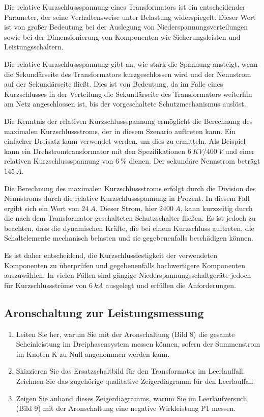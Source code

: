 \begin{enumerate}[label=\alph*)]
  Die relative Kurzschlussspannung eines Transformators ist ein entscheidender Parameter, der seine Verhaltensweise unter Belastung widerspiegelt. Dieser Wert ist von großer Bedeutung bei der Auslegung von Niederspannungsverteilungen sowie bei der Dimensionierung von Komponenten wie Sicherungsleisten und Leistungsschaltern.
  
  Die relative Kurzschlussspannung gibt an, wie stark die Spannung ansteigt, wenn die Sekundärseite des Transformators kurzgeschlossen wird und der Nennstrom auf der Sekundärseite fließt. Dies ist von Bedeutung, da im Falle eines Kurzschlusses in der Verteilung die Sekundärseite des Transformators weiterhin am Netz angeschlossen ist, bis der vorgeschaltete Schutzmechanismus auslöst.
  
  Die Kenntnis der relativen Kurzschlussspannung ermöglicht die Berechnung des maximalen Kurzschlussstroms, der in diesem Szenario auftreten kann. Ein einfacher Dreisatz kann verwendet werden, um dies zu ermitteln. Als Beispiel kann ein Drehstromtransformator mit den Spezifikationen $6\ KV / 400\ V$ und einer relativen Kurzschlussspannung von $6\ \%$ dienen. Der sekundäre Nennstrom beträgt $145\ A$.
  
  Die Berechnung des maximalen Kurzschlussstroms erfolgt durch die Division des Nennstroms durch die relative Kurzschlussspannung in Prozent. In diesem Fall ergibt sich ein Wert von $24\ A$. Dieser Strom, hier $2400\ A$, kann kurzzeitig durch die nach dem Transformator geschalteten Schutzschalter fließen. Es ist jedoch zu beachten, dass die dynamischen Kräfte, die bei einem Kurzschluss auftreten, die Schaltelemente mechanisch belasten und sie gegebenenfalls beschädigen können.
  
  Es ist daher entscheidend, die Kurzschlussfestigkeit der verwendeten Komponenten zu überprüfen und gegebenenfalls hochwertigere Komponenten auszuwählen. In vielen Fällen sind gängige Niederspannungsschaltgeräte jedoch für Kurzschlussströme von $6\ kA$ ausgelegt und erfüllen die Anforderungen.
  
\end{enumerate}
\subsection{Aronschaltung zur Leistungsmessung }
\begin{enumerate}[label=\alph*)]
  \item Leiten Sie her, warum Sie mit der Aronschaltung (Bild 8) die gesamte Scheinleistung im Dreiphasensystem messen können, sofern der Summenstrom im Knoten K zu Null angenommen werden kann.  
  \item Skizzieren Sie das Ersatzschaltbild für den Transformator im Leerlauffall. Zeichnen Sie das zugehörige qualitative Zeigerdiagramm für den Leerlauffall.
  \item Zeigen Sie anhand dieses Zeigerdiagramms, warum Sie im Leerlaufversuch (Bild 9) mit der Aronschaltung eine negative Wirkleistung P1 messen. 
\end{enumerate}

